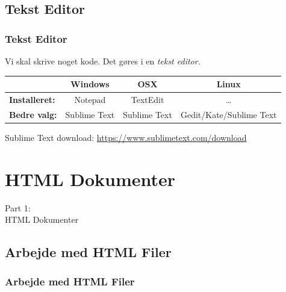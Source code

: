 \subsection{Tekst Editor}
\begin{frame}
    \frametitle{Tekst Editor}
    Vi skal skrive noget kode. Det gøres i en \textsl{tekst editor}.
    
    \vspace{1cm}
    \begin{center}
        \begin{tabular}{l|c|c|c|}
            \rowcolor{blue!25} \cellcolor{blue!0}
                                  & \textbf{Windows} & \textbf{OSX} & \textbf{Linux} \\
            \hline
            \rowcolor{blue!10} \cellcolor{blue!25}
            \textbf{Installeret:} & Notepad          & TextEdit     & \ldots \\
            \hline
            \rowcolor{blue!10} \cellcolor{blue!25}
            \textbf{Bedre valg:}  & Sublime Text     & Sublime Text & Gedit/Kate/Sublime Text \\
            \hline
        \end{tabular}
    \end{center}
    \vspace{1cm}
    
    Sublime Text download: \url{https://www.sublimetext.com/download}
\end{frame}

\section{HTML Dokumenter}
\begin{frame}
    \vspace{25mm}
    \begin{center}
        \Huge{Part 1:\\HTML Dokumenter}
    \end{center}
\end{frame}

\subsection{Arbejde med HTML Filer}
\begin{frame}
    \frametitle{Arbejde med HTML Filer}
    \vspace{20mm}
    \begin{center}
    \end{center}
\end{frame}

